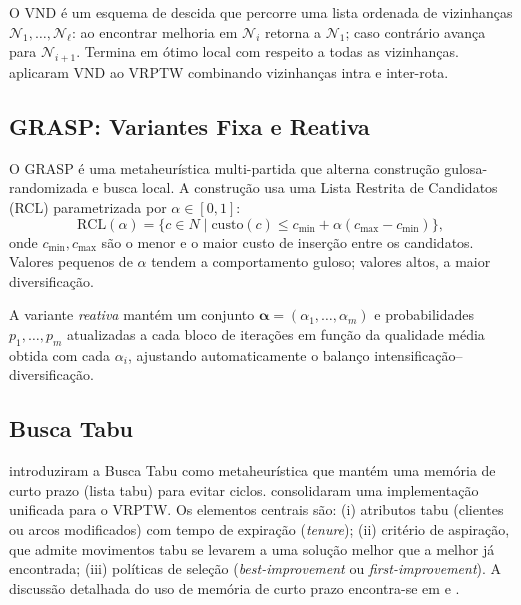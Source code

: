 \documentclass[10pt, a4paper]{article}
\begin{document}
O VND \citep{hansen2001} \'e um esquema de descida que percorre uma lista ordenada de vizinhan\c{c}as $\mathcal{N}_1, \ldots, \mathcal{N}_\ell$: ao encontrar melhoria em $\mathcal{N}_i$ retorna a $\mathcal{N}_1$; caso contr\'ario avan\c{c}a para $\mathcal{N}_{i+1}$. Termina em \'otimo local com respeito a todas as vizinhan\c{c}as. \citet{melo2008} aplicaram VND ao VRPTW combinando vizinhan\c{c}as intra e inter-rota.

\subsection{GRASP: Variantes Fixa e Reativa}

O GRASP \citep{feo1995, resende2003} \'e uma metaheur\'istica multi-partida que alterna constru\c{c}\~ao gulosa-randomizada e busca local. A constru\c{c}\~ao usa uma Lista Restrita de Candidatos (RCL) parametrizada por $\alpha \in [0,1]$:
\begin{equation}
\mathrm{RCL}(\alpha) = \{c \in N \mid \mathrm{custo}(c) \leq c_{\min} + \alpha (c_{\max} - c_{\min})\},
\label{eq:rcl}
\end{equation}
onde $c_{\min}, c_{\max}$ s\~ao o menor e o maior custo de inser\c{c}\~ao entre os candidatos. Valores pequenos de $\alpha$ tendem a comportamento guloso; valores altos, a maior diversifica\c{c}\~ao.

A variante \emph{reativa} \citep{prais2000} mant\'em um conjunto $\boldsymbol{\alpha} = (\alpha_1, \ldots, \alpha_m)$ e probabilidades $p_1, \ldots, p_m$ atualizadas a cada bloco de itera\c{c}\~oes em fun\c{c}\~ao da qualidade m\'edia obtida com cada $\alpha_i$, ajustando automaticamente o balan\c{c}o intensifica\c{c}\~ao--diversifica\c{c}\~ao.

\subsection{Busca Tabu}

\citet{glover1989, glover1990} introduziram a Busca Tabu como metaheur\'istica que mant\'em uma mem\'oria de curto prazo (lista tabu) para evitar ciclos. \citet{cordeau2001} consolidaram uma implementa\c{c}\~ao unificada para o VRPTW. Os elementos centrais s\~ao: (i) atributos tabu (clientes ou arcos modificados) com tempo de expira\c{c}\~ao (\textit{tenure}); (ii) crit\'erio de aspira\c{c}\~ao, que admite movimentos tabu se levarem a uma solu\c{c}\~ao melhor que a melhor j\'a encontrada; (iii) pol\'iticas de sele\c{c}\~ao (\textit{best-improvement} ou \textit{first-improvement}). A discuss\~ao detalhada do uso de mem\'oria de curto prazo encontra-se em \citet{glover1997} e \citet{gendreau2010}.
\end{document}
